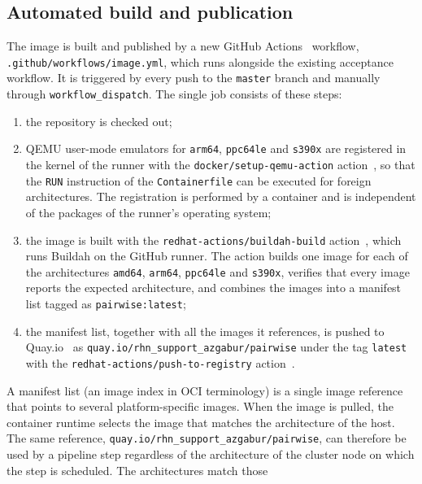 \documentclass[
  digital, %
  oneside, %
  lof,     %
  nolot,     %
]{fithesis4}
\begin{document}
\subsection{Automated build and publication}
\label{sec:container-ci}
The image is built and published by a new GitHub Actions~\cite{github-actions}
workflow, \texttt{.github/workflows/image.yml}, which runs alongside the
existing acceptance workflow. It is triggered by every push to the
\texttt{master} branch and manually through \texttt{workflow\_dispatch}. The
single job consists of these steps:
%
\begin{enumerate}
  \item the repository is checked out;
  \item QEMU user-mode emulators for \texttt{arm64}, \texttt{ppc64le} and
        \texttt{s390x} are registered in the kernel of the runner with the
        \texttt{docker/setup-qemu-action} action~\cite{setup-qemu-action}, so
        that the \texttt{RUN} instruction of the \texttt{Containerfile} can be
        executed for foreign architectures. The registration is performed by a
        container and is independent of the packages of the runner's
        operating system;
  \item the image is built with the \texttt{redhat-actions/buildah-build}
        action~\cite{buildah-build-action}, which runs Buildah on the GitHub
        runner. The action builds one image for each of the architectures
        \texttt{amd64}, \texttt{arm64}, \texttt{ppc64le} and \texttt{s390x},
        verifies that every image reports the expected architecture, and
        combines the images into a manifest list tagged as
        \texttt{pairwise:latest};
  \item the manifest list, together with all the images it references, is
        pushed to Quay.io~\cite{quay} as
        \texttt{quay.io/rhn\_support\_azgabur/pairwise} under the tag
        \texttt{latest} with the \texttt{redhat-actions/push-to-registry}
        action~\cite{push-to-registry-action}.
\end{enumerate}
%
A manifest list (an image index in \gls{OCI} terminology) is a single image
reference that points to several platform-specific images. When the image is
pulled, the container runtime selects the image that matches the architecture
of the host. The same reference, \texttt{quay.io/rhn\_support\_azgabur/pairwise},
can therefore be used by a pipeline step regardless of the architecture of the
cluster node on which the step is scheduled. The architectures match those
\end{document}
